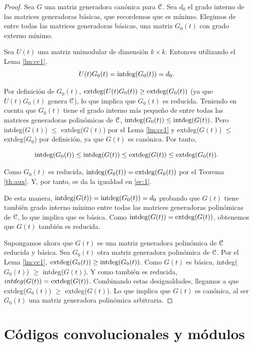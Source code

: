 \begin{proof} \phantom{}

\boxed{\Rightarrow}

Sea $G$ una matriz generadora canónica para $\mathcal C$. Sea $d_0$ el grado interno de las matrices generadoras básicas, que recordemos que es mínimo. Elegimos de entre todas las matrices generadoras básicas, una matriz $G_0(t)$ con grado externo mínimo.

Sea $U(t)$ una matriz unimodular de dimensión $k \times k$. Entonces utilizando el Lema \ref{lm:cc1}, $$U(t)G_0(t) = \textnormal{intdeg}(G_0(t)) = d_0.$$

Por definición de $G_0(t)$, $\textnormal{extdeg}(U(t)G_0(t)) \geq \textnormal{extdeg}(G_0(t))$ (ya que $U(t)G_0(t)$ genera $\mathcal C$), lo que implica que $G_0(t)$ es reducida. Teniendo en cuenta que $G_0(t)$ tiene el grado interno más pequeño de entre todas las matrices generadoras polinómicas de $\mathcal C$, $\textnormal{intdeg}(G_0(t)) \leq \textnormal{intdeg}(G(t))$. Pero intdeg($G(t)$) $\leq$ extdeg($G(t)$) por el Lema \ref{lm:cc1} y extdeg($G(t)$) $\leq$ extdeg($G_0$) por definición, ya que $G(t)$ es canónica. Por tanto,

\begin{equation}
\label{ec:1}
\textnormal{intdeg}(G_0(t)) \leq \textnormal{intdeg}(G(t)) \leq \textnormal{extdeg}(G(t)) \leq \textnormal{extdeg}(G_0(t)).
\end{equation}

Como $G_0(t)$ es reducida, $\textnormal{intdeg}(G_0(t)) = \textnormal{extdeg}(G_0(t))$ por el Teorema \ref{th:aux}. Y, por tanto, se da la igualdad en \eqref{ec:1}. 

De esta manera, $\textnormal{intdeg}(G(t)) = \textnormal{intdeg}(G_0(t)) = d_0$ probando que $G(t)$ tiene también grado interno mínimo entre todas las matrices generadoras polinómicas de $\mathcal C$, lo que implica que es básica. Como $\textnormal{intdeg}(G(t)) = \textnormal{extdeg}(G(t))$, obtenemos que $G(t)$ también es reducida.

\boxed{\Leftarrow}

Supongamos ahora que $G(t)$ es una matriz generadora polinómica de $\mathcal C$ reducida y básica. Sea $G_0(t)$ otra matriz generadora polinómica de $\mathcal C$. Por el Lema \ref{lm:cc1}, $\textnormal{extdeg}(G_0(t)) \geq \textnormal{intdeg}(G_0(t))$. Como $G(t)$ es básica, intdeg($G_0(t)$) $\geq$ intdeg($G(t)$). Y como también es reducida, $intdeg(G(t)) = \textnormal{extdeg}(G(t))$. Combinando estas desigualdades, llegamos a que extdeg($G_0(t)$) $\geq$ extdeg($G(t)$). Lo que implica que $G(t)$ es canónica, al ser $G_0(t)$ una matriz generadora polinómica arbitraria.
\end{proof}

\section{Códigos convolucionales y módulos}


